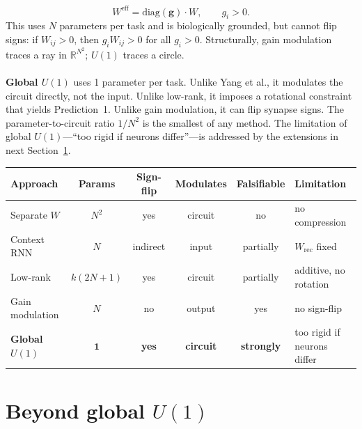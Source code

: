 \documentclass[11pt,a4paper]{article}
\newcommand{\R}{\mathbb{R}}
\newcommand{\Weff}{W^{\text{eff}}}
\begin{document}
{\begin{equation}
\Weff = \text{diag}(\mathbf{g})\cdot W, \qquad g_i > 0.
\end{equation}
This uses $N$ parameters per task and is biologically grounded, but cannot flip signs: if $W_{ij} > 0$, then $g_i W_{ij} > 0$ for all $g_i > 0$. Structurally, gain modulation traces a ray in $\R^{N^2}$; $U(1)$ traces a circle.
\\
\\
\textbf{Global $U(1)$} uses 1 parameter per task. Unlike Yang et al., it modulates the circuit directly, not the input. Unlike low-rank, it imposes a rotational constraint that yields Prediction~1. Unlike gain modulation, it can flip synapse signs. The parameter-to-circuit ratio $1/N^2$ is the smallest of any method. The limitation of global $U(1)$---``too rigid if neurons differ''---is addressed by the extensions in next Section~\ref{sec:beyond}.

\begin{center}
\renewcommand{\arraystretch}{1.3}
\begin{tabular}{@{}lccccl@{}}
\toprule
\textbf{Approach} & \textbf{Params} & \textbf{Sign-flip} & \textbf{Modulates} & \textbf{Falsifiable} & \textbf{Limitation} \\
\midrule
Separate $W$ & $N^2$ & yes & circuit & no & no compression \\
Context RNN & $N$ & indirect & input & partially & $W_{\text{rec}}$ fixed \\
Low-rank & $k(2N{+}1)$ & yes & circuit & partially & additive, no rotation \\
Gain modulation & $N$ & no & output & yes & no sign-flip \\[3pt]
\textbf{Global $U(1)$} & $\mathbf{1}$ & \textbf{yes} & \textbf{circuit} & \textbf{strongly} & too rigid if neurons differ \\
\bottomrule
\end{tabular}
\end{center}



\label{sec:beyond}

\newpage
\section{Beyond global $U(1)$}
\label{sec:beyond}

}
\end{document}
